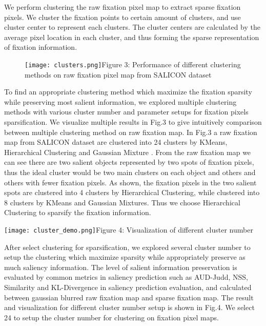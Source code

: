 \documentclass[letterpaper, 10 pt, conference]{ieeeconf}  %
\begin{document}
\par We perform clustering the raw fixation pixel map to extract sparse fixation pixels. We cluster the fixation points to certain amount of clusters, and use cluster center to represent each clusters. The cluster centers are calculated by the average pixel location in each cluster, and thus forming the sparse representation of fixation information.

\begin{figure}
\centering
    \texttt{[image: clusters.png]}{Figure 3: Performance of different clustering methods on raw fixation pixel map from SALICON dataset\label{fig3}}
\end{figure}

\par To find an appropriate clustering method which maximize the fixation sparsity while preserving most salient information, we explored multiple clustering methods with various cluster number and parameter setups for fixation pixels sparsification. We visualize multiple results in Fig.3 to give intuitively comparison between multiple clustering method on raw fixation map. In Fig.3 a raw fixation map from SALICON dataset are clustered into 24 clusters by KMeans, Hierarchical Clustering \cite{b26} and Gaussian Mixture \cite{b27}. From the raw fixation map we can see there are two salient objects represented by two spots of fixation pixels, thus the ideal cluster would be two main clusters on each object and others and others with fewer fixation pixels. As shown, the fixation pixels in the two salient spots are clustered into 4 clusters by Hierarchical Clustering, while clustered into 8 clusters by KMeans and Gaussian Mixtures. Thus we choose Hierarchical Clustering to sparsify the fixation information.

\begin{figure*}[!t]
\centering
    \texttt{[image: cluster\_demo.png]}{Figure 4: Visualization of different cluster number\label{fig4}}
\end{figure*}

\par After select clustering for sparsification, we explored several cluster number to setup the clustering which maximize sparsity while appropriately preserve as much saliency information. The level of salient information preservation is evaluated by common metrics in saliency prediction such as AUD-Judd, NSS, Similarity and KL-Divergence in saliency prediction evaluation, and calculated between gaussian blurred raw fixation map and sparse fixation map. The result and visualization for different cluster number setup is shown in Fig.4. We select 24 to setup the cluster number for clustering on fixation pixel maps.
\end{document}
